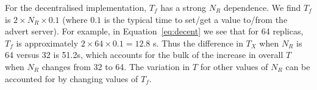 \documentclass{rspublic}
\newcommand{\jhanote}[1]{ {\textcolor{red} { ***shantenu: #1 }}}
\newcommand{\alnote}[1]{ {\textcolor{blue} { ***andre: #1 }}}
\newcommand{\athotanote}[1]{ {\textcolor{green} { ***athota: #1 }}}
\newcommand{\alnote}[1]{}
\newcommand{\athotanote}[1]{}
\newcommand{\jhanote}[1]{}
\begin{document}




For the decentralised implementation, $T_f$ has a strong $N_R$
dependence. We find $T_f$ is $2 \times N_R \times 0.1$ (where $0.1$ is
the typical time to set/get a value to/from the advert server).  For
example, in Equation~\ref{eq:decent} we see that for 64 replicas,
$T_f$ is approximately $2 \times 64 \times 0.1 = 12.8$ s.  Thus the
difference in $T_X$ when $N_R$ is 64 versus 32 is 51.2s, which
accounts for the bulk of the increase in overall $T$ when $N_R$
changes from 32 to 64. %
The variation in $T$ for other values of $N_R$ can be
accounted for by changing values of $T_f$.
\end{document}

